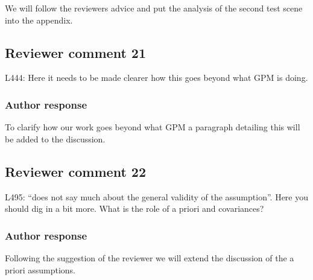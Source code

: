 \documentclass[11pt]{scrartcl}
\begin{document}
We will follow the reviewers advice and put the analysis of the second test scene
into the appendix.

\subsection*{Reviewer comment 21}
L444: Here it needs to be made clearer how this goes beyond what GPM is doing.


\subsubsection*{Author response}

To clarify how our work goes beyond what GPM a paragraph detailing this
will be added to the discussion.

%

\subsection*{Reviewer comment 22}
L495:  “does not say much about the general validity of the assumption”.   Here you should dig in a bit more. What is the role of a priori and covariances?

\subsubsection*{Author response}

Following the suggestion of the reviewer we will extend the discussion
of the a priori assumptions.
\end{document}
